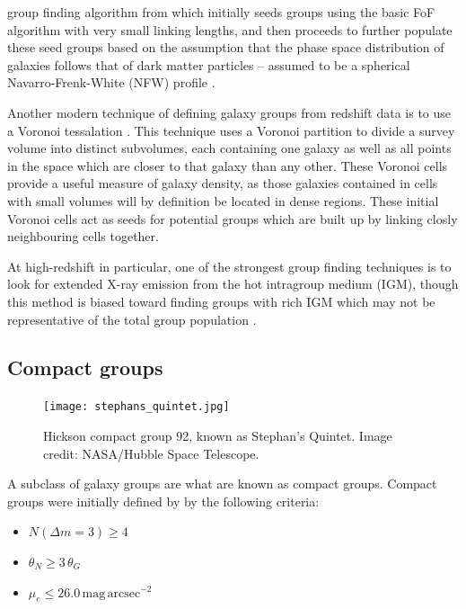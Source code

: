 group finding algorithm from \citet{yang2005, yang2007} which
initially seeds groups using the basic FoF algorithm with very small
linking lengths, and then proceeds to further populate these seed
groups based on the assumption that the phase space distribution of
galaxies follows that of dark matter particles -- assumed to be a
spherical Navarro-Frenk-White (NFW) profile \citep{navarro1997}.
\par
Another modern technique of defining galaxy groups from redshift data
is to use a Voronoi tessalation \citep{marinoni2002, gerke2005,
  gerke2012}.  This technique uses a Voronoi partition to divide a
survey volume into distinct subvolumes, each containing one
galaxy as well as all points in the space which are closer to that
galaxy than any other.  These Voronoi cells provide a useful measure
of galaxy density, as those galaxies contained in cells with small
volumes will by definition be located in dense regions.  These initial
Voronoi cells act as seeds for potential groups which are built up by
linking closly neighbouring cells together.
\par
At high-redshift in particular, one of the strongest group finding
techniques is to look for extended X-ray emission from the hot
intragroup medium (IGM), though this method is biased toward finding
groups with rich IGM which may not be representative of the total
group population \citep{connelly2012}.

\subsection{Compact groups}
\label{sec:compact_groups}

\begin{figure}[!ht]
  \centering
  \texttt{[image: stephans\_quintet.jpg]}
  \caption[Hickson compact group 92, known as Stephan's
    Quintet]{Hickson compact group 92, known as Stephan's Quintet. 
    Image credit: NASA/Hubble Space Telescope.}
  \label{fig:steph_quintet}
\end{figure}

A subclass of galaxy groups are what are known as compact groups.
Compact groups were initially defined by \citet{hickson1982} by the
following criteria:

\begin{itemize}
  \item $N(\Delta m = 3) \ge 4$

  \item $\theta_N \ge 3\,\theta_G$

  \item $\mu_e \le 26.0\,\mathrm{mag}\,\mathrm{arcsec^{-2}}$
\end{itemize}

